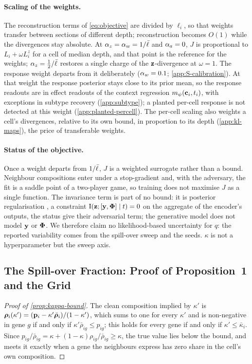 \paragraph{Scaling of the weights.} The reconstruction terms of \cref{eq:objective} are divided by $\ell_i$, so that weights transfer between sections of different depth; reconstruction becomes $O(1)$ while the divergences stay absolute. At $\alpha_z = \alpha_w = 1/\bar{\ell}$ and $\alpha_a = 0$, $J$ is proportional to $L_i + \omega L_i^{z}$ for a cell of median depth, and that point is the reference for the weights; $\alpha_z = \tfrac12/\bar{\ell}$ restores a single charge of the $\mathbf{z}$-divergence at $\omega = 1$. The response weight departs from it deliberately ($\alpha_w = 0.1$; \cref{app:S-calibration}). At that weight the response posterior stays close to its prior mean, so the response readouts are in effect readouts of the context regression $m_{\psi}(\mathbf{c}_i, t_i)$, with exceptions in subtype recovery (\cref{app:subtype}); a planted per-cell response is not detected at this weight (\cref{app:planted-percell}). The per-cell scaling also weights a cell's divergences, relative to its own bound, in proportion to its depth (\cref{app:kl-maps}), the price of transferable weights.

\paragraph{Status of the objective.} Once a weight departs from $1/\bar{\ell}$, $J$ is a weighted surrogate rather than a bound. Neighbour compositions enter under a stop-gradient and, with the adversary, the fit is a saddle point of a two-player game, so training does not maximise $J$ as a single function. The invariance term is part of no bound: it is posterior regularisation \citep{ganchev2010}, a constraint $\operatorname{I}(\mathbf{z}; [\mathbf{y}, \boldsymbol{\Phi}] \mid t) = 0$ on the aggregate of the encoder's outputs, the status \citet{slavutsky2025} give their adversarial term; the generative model does not model $\mathbf{y}$ or $\boldsymbol{\Phi}$. We therefore claim no likelihood-based uncertainty for $q$: the reported variability comes from the spill-over sweep and the seeds. $\kappa$ is not a hyperparameter but the sweep axis.

\subsection{The Spill-over Fraction: Proof of Proposition~1 and the Grid}
\label{app:kappa}

\begin{proof}[Proof of \cref{prop:kappa-bound}]
The clean composition implied by $\kappa'$ is $\boldsymbol{\rho}_i(\kappa') = (\mathbf{p}_i - \kappa'\bar{\boldsymbol{\rho}}_i)/(1-\kappa')$, which sums to one for every $\kappa'$ and is non-negative in gene $g$ if and only if $\kappa'\bar\rho_{ig} \le p_{ig}$; this holds for every gene if and only if $\kappa' \le \bar\kappa_i$. Since $p_{ig}/\bar\rho_{ig} = \kappa + (1-\kappa)\rho_{ig}/\bar\rho_{ig} \ge \kappa$, the true value lies below the bound, and meets it exactly when a gene the neighbours express has zero share in the cell's own composition.
\end{proof}

